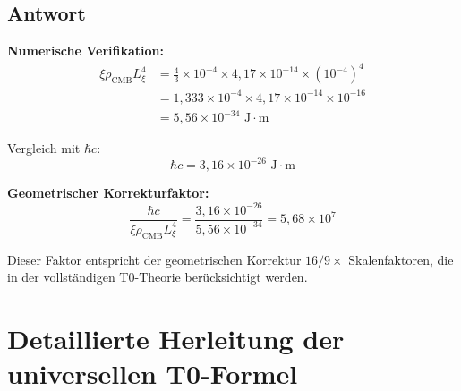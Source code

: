 \documentclass[12pt,a4paper]{article}
\theoremstyle{remark}
\newenvironment{answer}{\subsection*{Antwort}}{\vspace{1em}}
\begin{document}
\begin{answer}
	\textbf{Numerische Verifikation:}
	\begin{align}
		\xi \rho_{\text{CMB}} L_\xi^4 &= \frac{4}{3} \times 10^{-4} \times 4{,}17 \times 10^{-14} \times (10^{-4})^4 \\
		&= 1{,}333 \times 10^{-4} \times 4{,}17 \times 10^{-14} \times 10^{-16} \\
		&= 5{,}56 \times 10^{-34} \text{ J} \cdot \text{m}
	\end{align}
	
	Vergleich mit $\hbar c$:
	\begin{equation}
		\hbar c = 3{,}16 \times 10^{-26} \text{ J} \cdot \text{m}
	\end{equation}
	
	\textbf{Geometrischer Korrekturfaktor:}
	\begin{equation}
		\frac{\hbar c}{\xi \rho_{\text{CMB}} L_\xi^4} = \frac{3{,}16 \times 10^{-26}}{5{,}56 \times 10^{-34}} = 5{,}68 \times 10^{7}
	\end{equation}
	
	Dieser Faktor entspricht der geometrischen Korrektur $16/9 \times$ Skalenfaktoren, die in der vollständigen T0-Theorie berücksichtigt werden.
\end{answer}
\section{Detaillierte Herleitung der universellen T0-Formel}
\end{document}
